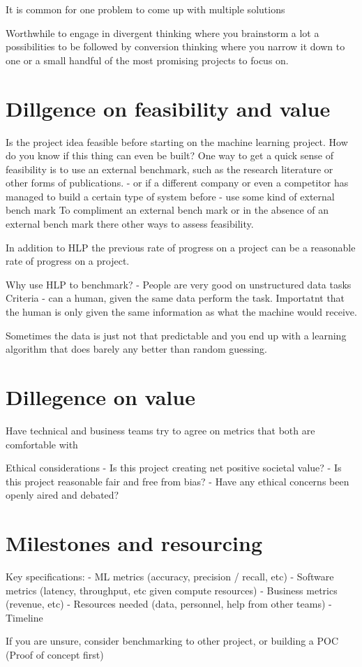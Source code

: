 It is common for one problem to come up with multiple solutions

Worthwhile to engage in divergent thinking where you brainstorm a lot a possibilities to be followed by conversion thinking where you narrow it down to one or a small handful of the most promising projects to focus on.

\section{Dillgence on feasibility and value}

Is the project idea feasible before starting on the machine learning project.
How do you know if this thing can even be built?
One way to get a quick sense of feasibility is to use an external benchmark, such as the research literature or other forms of publications.
- or if a different company or even a competitor has managed to build a certain type of system before
- use some kind of external bench mark
To compliment an external bench mark or in the absence of an external bench mark there other ways to assess feasibility.


In addition to HLP the previous rate of progress on a project can be a reasonable rate of progress on a project.

Why use HLP to benchmark?
- People are very good on unstructured data tasks
Criteria - can a human, given the same data perform the task.
Importatnt that the human is only given the same information as what the machine would receive.

Sometimes the data is just not that predictable and you end up with a learning algorithm that does barely any better than random guessing.




\section{Dillegence on value}

Have technical and business teams try to agree on metrics that both are comfortable with

Ethical considerations
- Is this project creating net positive societal value?
- Is this project reasonable fair and free from bias?
- Have any ethical concerns been openly aired and debated?

\section{Milestones and resourcing}

Key specifications:
- ML metrics (accuracy, precision / recall, etc)
- Software metrics (latency, throughput, etc given compute resources)
- Business metrics (revenue, etc)
- Resources needed (data, personnel, help from other teams)
- Timeline

If you are unsure, consider benchmarking to other project, or building a POC (Proof of concept first)
